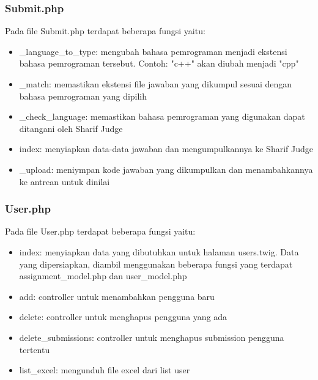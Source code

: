 \subsubsection{Submit.php}
Pada file Submit.php terdapat beberapa fungsi yaitu:
\begin{itemize}
	\item \_language\_to\_type: mengubah bahasa pemrograman menjadi ekstensi bahasa pemrograman tersebut. Contoh: "c++" akan diubah menjadi "cpp"
	\item \_match: memastikan ekstensi file jawaban yang dikumpul sesuai dengan bahasa pemrograman yang dipilih
	\item \_check\_language: memastikan bahasa pemrograman yang digunakan dapat ditangani oleh Sharif Judge
	\item index: menyiapkan data-data jawaban dan mengumpulkannya ke Sharif Judge
	\item \_upload: meniympan kode jawaban yang dikumpulkan dan menambahkannya ke antrean untuk dinilai
\end{itemize}

\subsubsection{User.php}
Pada file User.php terdapat beberapa fungsi yaitu:
\begin{itemize}
	\item index: menyiapkan data yang dibutuhkan untuk halaman users.twig. Data yang dipersiapkan, diambil menggunakan beberapa fungsi yang terdapat assignment\_model.php dan user\_model.php
	\item add: controller untuk menambahkan pengguna baru
	\item delete: controller untuk menghapus pengguna yang ada
	\item delete\_submissions: controller untuk menghapus submission pengguna tertentu
	\item list\_excel: mengunduh file excel dari list user
\end{itemize}